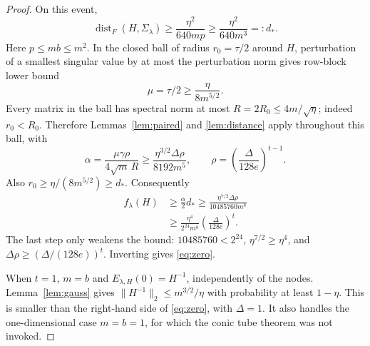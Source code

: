 \documentclass[11pt]{article}
\numberwithin{equation}{section}
\theoremstyle{definition}
\newcommand{\dist}{\operatorname{dist}}
\newcommand{\nn}[1]{\lVert #1\rVert}
\begin{document}
\begin{proof}
On this event,
\begin{equation}\label{eq:distgood}
\dist_F(H,\Sigma_\lambda)\ge\frac{\eta^2}{640mp}
\ge\frac{\eta^2}{640m^3}=:d_*.
\end{equation}
Here $p\le mb\le m^2$. In the closed ball of radius $r_0=\tau/2$ around $H$, perturbation of a smallest singular value by at most the perturbation norm gives row-block lower bound
\[
\mu=\tau/2\ge\frac{\eta}{8m^{5/2}}.
\]
Every matrix in the ball has spectral norm at most $R=2R_0\le4m/\sqrt\eta$; indeed $r_0<R_0$. Therefore Lemmas~\ref{lem:paired} and \ref{lem:distance} apply throughout this ball, with
\begin{equation}\label{eq:alphagood}
\alpha=\frac{\mu\gamma\rho}{4\sqrt m\,R}
\ge\frac{\eta^{3/2}\Delta\rho}{8192m^5},
\qquad \rho=\left(\frac{\Delta}{128e}\right)^{t-1}.
\end{equation}
Also $r_0\ge\eta/(8m^{5/2})\ge d_*$. Consequently
\begin{align}
f_\lambda(H)&\ge\frac\alpha2d_*
\ge\frac{\eta^{7/2}\Delta\rho}{10485760m^8}\nonumber\\
&\ge\frac{\eta^4}{2^{24}m^8}\left(\frac{\Delta}{128e}\right)^t.
\label{eq:fbound}
\end{align}
The last step only weakens the bound: $10485760<2^{24}$, $\eta^{7/2}\ge\eta^4$, and $\Delta\rho\ge(\Delta/(128e))^t$. Inverting gives \eqref{eq:zero}.

When $t=1$, $m=b$ and $E_{\lambda,H}(0)=H^{-1}$, independently of the nodes. Lemma~\ref{lem:gauss} gives $\nn{H^{-1}}_2\le m^{3/2}/\eta$ with probability at least $1-\eta$. This is smaller than the right-hand side of \eqref{eq:zero}, with $\Delta=1$. It also handles the one-dimensional case $m=b=1$, for which the conic tube theorem was not invoked.
\end{proof}
\end{document}
